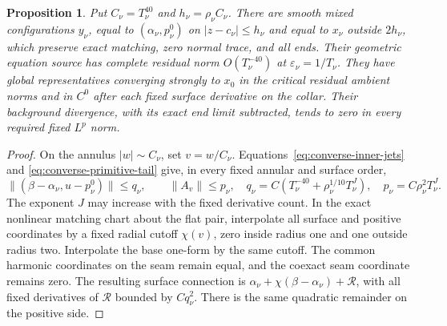 \documentclass[11pt]{amsart}
\newtheorem{proposition}[theorem]{Proposition}
\theoremstyle{definition}
\theoremstyle{remark}
\theoremstyle{plain}
\begin{document}
\begin{proposition}\label{prop:converse-core-removal}
Put $C_\nu=T_\nu^{40}$ and $h_\nu=\rho_\nu C_\nu$.
There are smooth mixed configurations $y_\nu$, equal to
$(\alpha_\nu,p_\nu^0)$ on $|z-c_\nu|\leq h_\nu$ and equal
to $x_\nu$ outside $2h_\nu$, which preserve exact matching,
zero normal trace, and all ends. Their geometric equation source
has complete residual norm $O(T_\nu^{-40})$ at
$\varepsilon_\nu=1/T_\nu$. They have global representatives
converging strongly to $x_0$ in the critical residual ambient
norms and in $C^0$ after each fixed surface derivative on the
collar. Their background divergence, with its exact end limit
subtracted, tends to zero in every required fixed $L^p$ norm.
\end{proposition}

\begin{proof}
On the annulus $|w|\sim C_\nu$, set $v=w/C_\nu$.
Equations~\eqref{eq:converse-inner-jets} and
\eqref{eq:converse-primitive-tail} give, in every fixed annular
and surface order,
\begin{equation}\label{eq:converse-removal-annulus}
 \|(\beta-\alpha_\nu,u-p_\nu^0)\|\leq q_\nu,\qquad
 \|A_v\|\leq p_\nu,\quad
 q_\nu=C(T_\nu^{-40}+\rho_\nu^{1/10}T_\nu^J),\quad
 p_\nu=C\rho_\nu^2T_\nu^J.
\end{equation}
The exponent $J$ may increase with the fixed derivative count.
In the exact nonlinear matching chart about the flat pair,
interpolate all surface and positive coordinates by a fixed
radial cutoff $\chi(v)$, zero inside radius one and one outside
radius two. Interpolate the base one-form by the same cutoff.
The common harmonic coordinates on the seam remain equal,
and the coexact seam coordinate remains zero. The resulting
surface connection is
$\alpha_\nu+\chi(\beta-\alpha_\nu)+\mathcal R$,
with all fixed derivatives of $\mathcal R$ bounded by $Cq_\nu^2$.
There is the same quadratic remainder on the positive side.


\end{proof}
\end{document}
